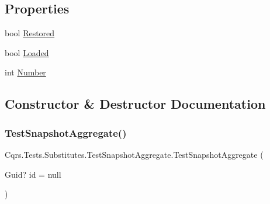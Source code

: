 \subsection*{Properties}
\begin{DoxyCompactItemize}
\item 
bool \hyperlink{classCqrs_1_1Tests_1_1Substitutes_1_1TestSnapshotAggregate_aa184bd1b8db3b8497056f1798d802bc3_aa184bd1b8db3b8497056f1798d802bc3}{Restored}
\item 
bool \hyperlink{classCqrs_1_1Tests_1_1Substitutes_1_1TestSnapshotAggregate_acc2cfa85e50c057e28c1eb84061bb913_acc2cfa85e50c057e28c1eb84061bb913}{Loaded}
\item 
int \hyperlink{classCqrs_1_1Tests_1_1Substitutes_1_1TestSnapshotAggregate_a490acc643bfcec8a7bfd7bc1ca06b9dd_a490acc643bfcec8a7bfd7bc1ca06b9dd}{Number}
\end{DoxyCompactItemize}


\subsection{Constructor \& Destructor Documentation}
\mbox{\label{classCqrs_1_1Tests_1_1Substitutes_1_1TestSnapshotAggregate_aeb457b965fe66b7cb642a79e82b3c7ce_aeb457b965fe66b7cb642a79e82b3c7ce}} 
\subsubsection{\texorpdfstring{Test\+Snapshot\+Aggregate()}{TestSnapshotAggregate()}}
{\footnotesize\ttfamily Cqrs.\+Tests.\+Substitutes.\+Test\+Snapshot\+Aggregate.\+Test\+Snapshot\+Aggregate (\begin{DoxyParamCaption}\item[{Guid?}]{id = {\ttfamily null} }\end{DoxyParamCaption})}



